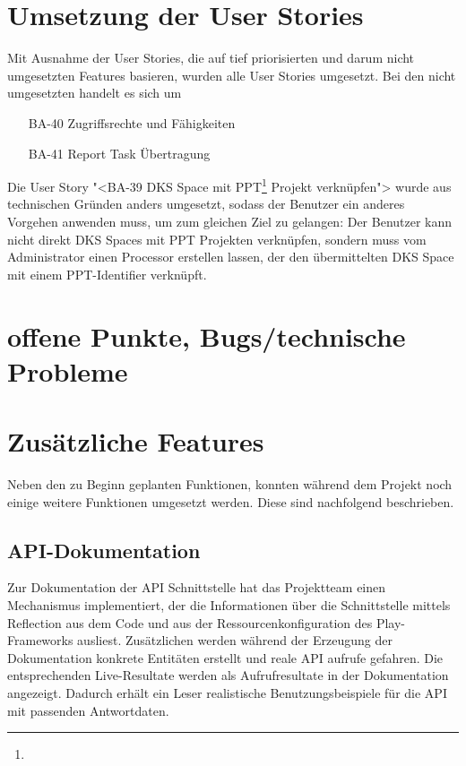 			
	\section{Umsetzung der User Stories}
		Mit Ausnahme der User Stories, die auf tief priorisierten und darum nicht umgesetzten Features basieren, wurden alle User Stories umgesetzt.
		Bei den nicht umgesetzten handelt es sich um
		\begin{itemize}
			\item[BA-40] Zugriffsrechte und Fähigkeiten
			\item[BA-41] Report Task Übertragung
		\end{itemize}
		
		Die User Story "<BA-39 DKS Space mit PPT\footnote{\ppt} Projekt verknüpfen"> wurde aus technischen Gründen anders umgesetzt, 
		sodass der Benutzer ein anderes Vorgehen anwenden muss, um zum gleichen Ziel zu gelangen: Der Benutzer kann nicht direkt DKS Spaces mit PPT Projekten verknüpfen, sondern muss vom Administrator einen Processor erstellen lassen, der den übermittelten DKS Space mit einem PPT-Identifier verknüpft.

	
	\section{offene Punkte, Bugs/technische Probleme}
	
	
	\section{Zusätzliche Features}
		Neben den zu Beginn geplanten Funktionen, konnten während dem Projekt noch einige weitere Funktionen umgesetzt werden.
		Diese sind nachfolgend beschrieben.
		\subsection{API-Dokumentation}
			Zur Dokumentation der API Schnittstelle hat das Projektteam
			einen Mechanismus implementiert, der die Informationen über die Schnittstelle mittels Reflection aus dem Code und aus der Ressourcenkonfiguration des Play-Frameworks ausliest.
			Zusätzlichen werden während der Erzeugung der Dokumentation konkrete Entitäten erstellt und reale API aufrufe gefahren.
			Die entsprechenden Live-Resultate werden als Aufrufresultate in der Dokumentation angezeigt.
			Dadurch erhält ein Leser realistische Benutzungsbeispiele für die API mit passenden Antwortdaten.
			
